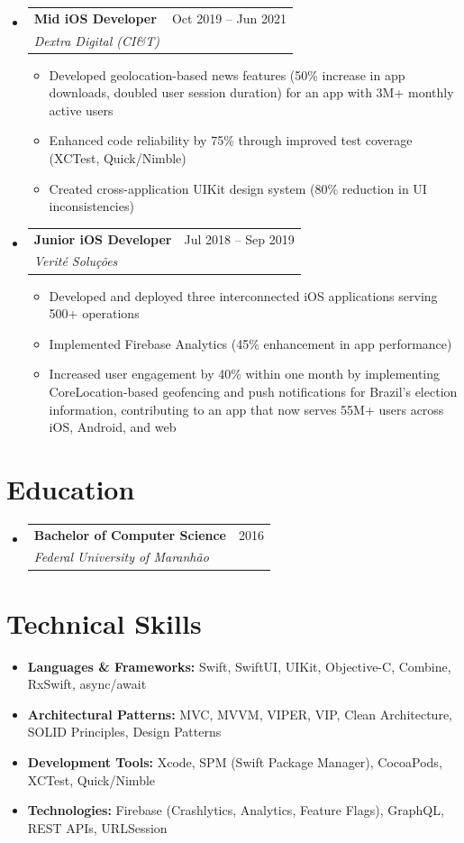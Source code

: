 \documentclass[11pt,letterpaper]{article}
\makeatletter
\newcommand{\resumeSubheading}[4]{
  \item
    \begin{tabular*}{\textwidth}{l@{\extracolsep{\fill}}r}
      \textbf{#1} & #2 \\
      \textit{#3} & \textit{#4} \\
    \end{tabular*}
}
\newcommand{\resumeItem}[1]{
  \item\small{#1}
}
\makeatother
\begin{document}
\begin{itemize}[leftmargin=0.15in]
    \resumeSubheading
        {Mid iOS Developer}{Oct 2019 -- Jun 2021}
        {Dextra Digital (CI\&T)}{}
        \begin{itemize}
            \resumeItem{Developed geolocation-based news features (50\% increase in app downloads, doubled user session duration) for an app with 3M+ monthly active users}
            \resumeItem{Enhanced code reliability by 75\% through improved test coverage (XCTest, Quick/Nimble)}
            \resumeItem{Created cross-application UIKit design system (80\% reduction in UI inconsistencies)}
        \end{itemize}

    \resumeSubheading
        {Junior iOS Developer}{Jul 2018 -- Sep 2019}
        {Verité Soluções}{}
        \begin{itemize}
            \resumeItem{Developed and deployed three interconnected iOS applications serving 500+ operations}
            \resumeItem{Implemented Firebase Analytics (45\% enhancement in app performance)}
            \resumeItem{Increased user engagement by 40\% within one month by implementing CoreLocation-based geofencing and push notifications for Brazil's election information, contributing to an app that now serves 55M+ users across iOS, Android, and web}
        \end{itemize}
\end{itemize}

\section*{Education}

\begin{itemize}[leftmargin=0.15in]
    \resumeSubheading
        {Bachelor of Computer Science}{2016}
        {Federal University of Maranhão}{}
\end{itemize}

\section*{Technical Skills}

\begin{itemize}[leftmargin=0.15in]
    \item \textbf{Languages \& Frameworks:} Swift, SwiftUI, UIKit, Objective-C, Combine, RxSwift, async/await
    \item \textbf{Architectural Patterns:} MVC, MVVM, VIPER, VIP, Clean Architecture, SOLID Principles, Design Patterns
    \item \textbf{Development Tools:} Xcode, SPM (Swift Package Manager), CocoaPods, XCTest, Quick/Nimble
    \item \textbf{Technologies:} Firebase (Crashlytics, Analytics, Feature Flags), GraphQL, REST APIs, URLSession
\end{itemize}
\end{document}

